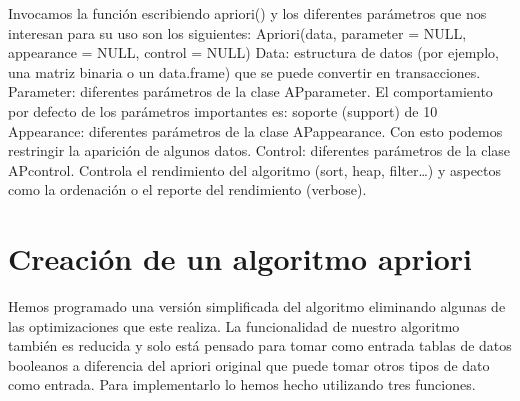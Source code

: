 \documentclass [a4paper] {article}
\begin{document}
\vspace{5mm}

Invocamos la función escribiendo apriori() y los diferentes parámetros que nos interesan para su uso son los siguientes:
Apriori(data, parameter = NULL, appearance = NULL, control = NULL)
Data: estructura de datos (por ejemplo, una matriz binaria o un data.frame) que se puede convertir en transacciones.
Parameter: diferentes parámetros de la clase APparameter. El comportamiento por defecto de los parámetros importantes es: soporte (support) de 10%
Appearance: diferentes parámetros de la clase APappearance. Con esto podemos restringir la aparición de algunos datos.
Control: diferentes parámetros de la clase APcontrol. Controla el rendimiento del algoritmo (sort, heap, filter…) y aspectos como la ordenación o el reporte del rendimiento (verbose).

\section{Creación de un algoritmo apriori}
Hemos programado una versión simplificada del algoritmo eliminando algunas de las optimizaciones que este realiza.
La funcionalidad de nuestro algoritmo también es reducida y solo está pensado para tomar como entrada tablas de datos booleanos 
a diferencia del apriori original que puede tomar otros tipos de dato como entrada.
Para implementarlo lo hemos hecho utilizando tres funciones.
\end{document}
